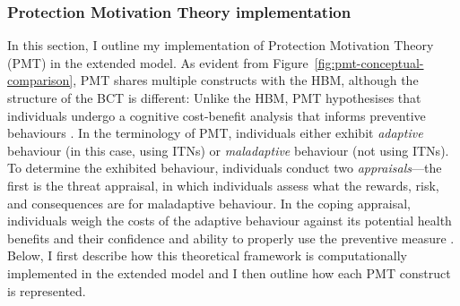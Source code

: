 \subsubsection{Protection Motivation Theory implementation}

\begin{figure}[hbt!]
     \centering
     \begin{adjustbox}{center}
         \resizebox{1.3\textwidth}{!}{
            
         }
     \end{adjustbox}
    \label{fig:pmt-implementation}
\end{figure}

In this section, I outline my implementation of Protection Motivation Theory (PMT) in the extended model. As evident from Figure~\ref{fig:pmt-conceptual-comparison}, PMT shares multiple constructs with the HBM, although the structure of the BCT is different: Unlike the HBM, PMT hypothesises that individuals undergo a cognitive cost-benefit analysis that informs preventive behaviours \cite{rogers_cognitive_1983, norman_protection_2015}. In the terminology of PMT, individuals either exhibit \textit{adaptive} behaviour (in this case, using ITNs) or \textit{maladaptive} behaviour (not using ITNs). To determine the exhibited behaviour, individuals conduct two \textit{appraisals}---the first is the threat appraisal, in which individuals assess what the rewards, risk, and consequences are for maladaptive behaviour. In the coping appraisal, individuals weigh the costs of the adaptive behaviour against its potential health benefits and their confidence and ability to properly use the preventive measure \cite{marikyan_protection_2023}. Below, I first describe how this theoretical framework is computationally implemented in the extended model and I then outline how each PMT construct is represented.

